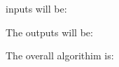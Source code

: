 inputs will be\+:

\begin{DoxyItemize}
\item The outputs will be\+:\end{DoxyItemize}
\begin{DoxyItemize}
\item The overall algorithim is\+: \end{DoxyItemize}
